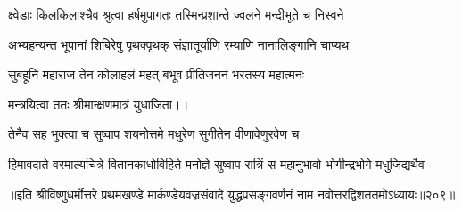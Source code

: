 \twolineshloka
{क्ष्वेडाः किलकिलाश्चैव श्रुत्वा हर्षमुपागतः}
{तस्मिन्प्रशान्ते ज्वलने मन्दीभूते च निस्वने}%

\twolineshloka
{अभ्यहन्यन्त भूपानां शिबिरेषु पृथक्पृथक्}
{संज्ञातूर्याणि रम्याणि नानालिङ्गानि चाप्यथ}%

\twolineshloka
{सुबहूनि महाराज तेन कोलाहलं महत्}
{बभूव प्रीतिजननं भरतस्य महात्मनः}%

मन्त्रयित्वा ततः श्रीमान्क्षणमात्रं युधाजिता।।

\twolineshloka
{तेनैव सह भुक्त्वा च सुष्वाप शयनोत्तमे}
{मधुरेण सुगीतेन वीणावेणुरवेण च}%

\twolineshloka
{हिमावदाते वरमाल्यचित्रे वितानकाधोविहिते मनोज्ञे}
{सुष्वाप रात्रिं स महानुभावो भोगीन्द्रभोगे मधुजिद्यथैव}%

॥इति श्रीविष्णुधर्मोत्तरे प्रथमखण्डे मार्कण्डेयवज्रसंवादे युद्धप्रसङ्गवर्णनं नाम नवोत्तरद्विशततमोऽध्यायः॥२०९॥
